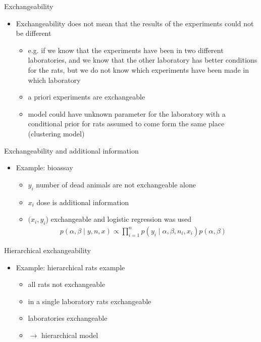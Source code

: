 \documentclass[finnish,english,t]{beamer}
\begin{document}
\begin{frame}{Exchangeability}

  \begin{itemize}
  \item Exchangeability does not mean that the results of the
    experiments could not be different
    \begin{itemize}
    \item e.g. if we know that the experiments have been in two
      different laboratories, and we know that the other laboratory
      has better conditions for the rats, but we do not know which
      experiments have been made in which laboratory
    \item a priori experiments are exchangeable
    \item model could have unknown parameter for the laboratory with a
      conditional prior for rats assumed to come form the same place
      (clustering model)
    \end{itemize}
  \end{itemize}
\end{frame}

\begin{frame}{Exchangeability and additional information}

  \begin{itemize}
  \item Example: bioassay
    \begin{itemize}
      \item<+-> $y_i$ number of dead animals are not exchangeable alone
      \item<+-> $x_i$ dose is additional information
      \item<+-> $(x_i,y_i$) exchangeable and logistic regression was used
    \begin{align*}
      p(\alpha,\beta \mid y,n,x)\propto \prod_{i=1}^n p(y_i \mid \alpha,\beta,n_i,x_i)p(\alpha,\beta)
    \end{align*}
    \end{itemize}
  \end{itemize}
\end{frame}

\begin{frame}{Hierarchical exchangeability}

  \begin{itemize}
  \item Example: hierarchical rats example
    \begin{itemize}
    \item<+-> all rats not exchangeable
    \item<+-> in a single laboratory rats exchangeable
    \item<+-> laboratories exchangeable
    \item<+-> $\rightarrow$ hierarchical model
    \end{itemize}
  \end{itemize}
\end{frame}
\end{document}
